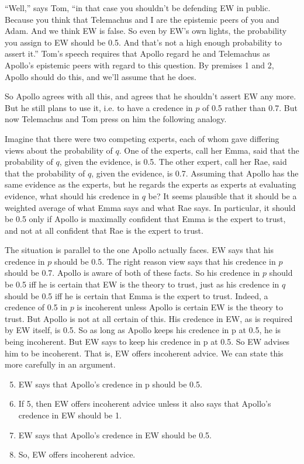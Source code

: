 ``Well,'' says Tom, ``in that case you shouldn't be defending EW in public. Because you think that Telemachus and I are the epistemic peers of you and Adam. And we think EW is false. So even by EW's own lights, the probability you assign to EW should be 0.5. And that's not a high enough probability to assert it.'' Tom's speech requires that Apollo regard he and Telemachus as Apollo's epistemic peers with regard to this question. By premises 1 and 2, Apollo should do this, and we'll assume that he does.

So Apollo agrees with all this, and agrees that he shouldn't assert EW any more. But he still plans to use it, i.e. to have a credence in $p$ of 0.5 rather than 0.7. But now Telemachus and Tom press on him the following analogy.

Imagine that there were two competing experts, each of whom gave differing views about the probability of $q$. One of the experts, call her Emma, said that the probability of $q$, given the evidence, is 0.5. The other expert, call her Rae, said that the probability of $q$, given the evidence, is 0.7. Assuming that Apollo has the same evidence as the experts, but he regards the experts as experts at evaluating evidence, what should his credence in $q$ be? It seems plausible that it should be a weighted average of what Emma says and what Rae says. In particular, it should be 0.5 only if Apollo is maximally confident that Emma is the expert to trust, and not at all confident that Rae is the expert to trust.

The situation is parallel to the one Apollo actually faces. EW says that his credence in $p$ should be 0.5. The right reason view says that his credence in $p$ should be 0.7. Apollo is aware of both of these facts. So his credence in $p$ should be 0.5 iff he is certain that EW is the theory to trust, just as his credence in $q$ should be 0.5 iff he is certain that Emma is the expert to trust. Indeed, a credence of 0.5 in $p$ is incoherent unless Apollo is certain EW is the theory to trust. But Apollo is not at all certain of this. His credence in EW, as is required by EW itself, is 0.5. So as long as Apollo keeps his credence in p at 0.5, he is being incoherent. But EW says to keep his credence in p at 0.5. So EW advises him to be incoherent. That is, EW offers incoherent advice. We can state this more carefully in an argument.

\begin{enumerate}
\setcounter{enumi}{4}
\item EW says that Apollo's credence in p should be 0.5.
\item If 5, then EW offers incoherent advice unless it also says that Apollo's credence in EW should be 1.
\item EW says that Apollo's credence in EW should be 0.5.
\item So, EW offers incoherent advice.
\end{enumerate}

